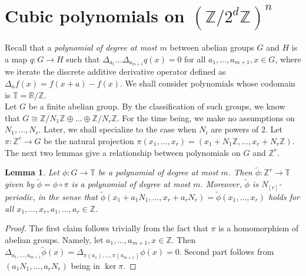 \documentclass[a4paper,11pt]{article}
\numberwithin{theorem}{section}
\newtheorem{lemma}[theorem]{Lemma}
\theoremstyle{definition}
\begin{document}
\appendix



\section{Cubic polynomials on $(\mathbb{Z}/2^d\mathbb{Z})^n$}

Recall that a \textit{polynomial of degree at most $m$} between abelian groups $G$ and $H$ is a map $q: G \to H$ such that $\Delta_{a_1}\dots \Delta_{a_{m+1}} q(x) = 0$ for all $a_1, \dots, a_{m+1}, x \in G$, where we iterate the discrete additive derivative operator defined as $\Delta_af(x) = f(x +a) - f(x)$. We shall consider polynomials whose codomain is $\mathbb{T} = \mathbb{R}/\mathbb{Z}$.\\

Let $G$ be a finite abelian group. By the classification of such groups, we know that $G \cong \mathbb{Z}/N_1\mathbb{Z} \oplus \dots \oplus \mathbb{Z}/N_r\mathbb{Z}$. For the time being, we make no assumptions on $N_1, \dots, N_r$. Later, we shall specialize to the case when $N_i$ are powers of 2. Let $\pi: \mathbb{Z}^r \to G$ be the natural projection $\pi(x_1, \dots, x_r) = (x_1 + N_1 \mathbb{Z}, \dots, x_r + N_r \mathbb{Z})$.\\

The next two lemmas give a relationship between polynomials on $G$ and $\mathbb{Z}^r$.

\begin{lemma}
    Let $\phi : G \to \mathbb{T}$ be a polynomial of degree at most $m$. Then $\tilde{\phi} : \mathbb{Z}^r \to \mathbb{T}$ given by $\tilde{\phi} = \phi \circ \pi$ is a polynomial of degree at most $m$. Moreover, $\tilde{\phi}$ is \textit{$N_{[r]}$-periodic}, in the sense that $\tilde{\phi}(x_1 + a_1 N_1, \dots, x_r + a_r N_r) = \tilde{\phi}(x_1, \dots, x_r)$ holds for all $x_1, \dots, x_r,a_1, \dots, a_r \in \mathbb{Z}$.
\end{lemma}

\begin{proof}
    The first claim follows trivially from the fact that $\pi$ is a homomorphism of abelian groups. Namely, let $a_1, \dots, a_{m + 1}, x \in \mathbb{Z}$. Then $\Delta_{a_1, \dots, a_{m+1}} \tilde{\phi}(x) = \Delta_{\pi(a_1), \dots, \pi(a_{m+1})} \phi(x) = 0$. Second part follows from $(a_1N_1, \dots, a_rN_r)$ being in $\ker \pi$. 
\end{proof}
\end{document}
